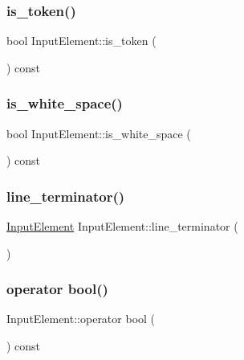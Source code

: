 \subsubsection{\texorpdfstring{is\+\_\+token()}{is\_token()}}
{\footnotesize\ttfamily bool Input\+Element\+::is\+\_\+token (\begin{DoxyParamCaption}{ }\end{DoxyParamCaption}) const}

\mbox{\label{class_input_element_af9fdf1da0079e858a7a6ad0b5e68d2be}} 
\subsubsection{\texorpdfstring{is\+\_\+white\+\_\+space()}{is\_white\_space()}}
{\footnotesize\ttfamily bool Input\+Element\+::is\+\_\+white\+\_\+space (\begin{DoxyParamCaption}{ }\end{DoxyParamCaption}) const}

\mbox{\label{class_input_element_ae640c23f2603ce464f32bd57c5595656}} 
\subsubsection{\texorpdfstring{line\+\_\+terminator()}{line\_terminator()}}
{\footnotesize\ttfamily \hyperlink{class_input_element}{Input\+Element} Input\+Element\+::line\+\_\+terminator (\begin{DoxyParamCaption}{ }\end{DoxyParamCaption})\hspace{0.3cm}{\ttfamily [static]}}

\mbox{\label{class_input_element_af7bde3d94430ad92b13ffc395e36bb05}} 
\subsubsection{\texorpdfstring{operator bool()}{operator bool()}}
{\footnotesize\ttfamily Input\+Element\+::operator bool (\begin{DoxyParamCaption}{ }\end{DoxyParamCaption}) const\hspace{0.3cm}{\ttfamily [explicit]}}

